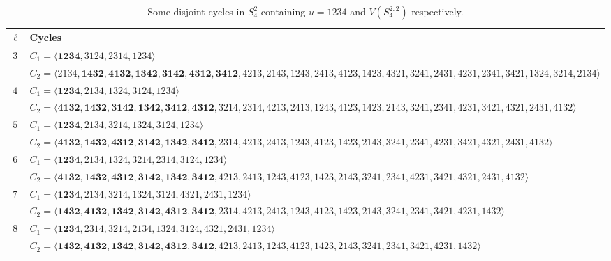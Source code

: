 \documentclass[12pt,a4paper]{amsart}
\newcounter{foo}[subsection]
\theoremstyle{definition}
\begin{document}
\begin{table}[htbp]
\centering
\begin{adjustbox}{angle=90,max height=\textheight} %
\begin{minipage}{\textheight} %
\centering
\caption{Some disjoint cycles in $S_4^2$ containing $u=1234$ and $V(S_4^{2:2})$ respectively.}
\label{3-13}

\footnotesize
\setlength{\tabcolsep}{2pt}
\renewcommand{\arraystretch}{0.9}

\begin{tabular}{@{}c l@{}}
\toprule
$\ell$ & Cycles \\
\midrule

$3$ &
$C_1=\langle\mathbf{1234},3124,2314,1234\rangle$\\
&
$C_2=\langle2134,\mathbf{1432,4132,1342,3142,4312,3412},4213,2143,1243,2413,4123,1423,4321,3241,2431,4231,2341,3421,1324,3214,2134\rangle$\\
\midrule

$4$ &
$C_1=\langle\mathbf{1234},2134,1324,3124,1234\rangle$\\
&
$C_2=\langle\mathbf{4132,1432,3142,1342,3412,4312},3214,2314,4213,2413,1243,4123,1423,2143,3241,2341,4231,3421,4321,2431,4132\rangle$\\

$5$ &
$C_1=\langle\mathbf{1234},2134,3214,1324,3124,1234\rangle$\\
&
$C_2=\langle\mathbf{4132,1432,4312,3142,1342,3412},2314,4213,2413,1243,4123,1423,2143,3241,2341,4231,3421,4321,2431,4132\rangle$
\\
\midrule

$6$ &
$C_1=\langle\mathbf{1234},2134,1324,3214,2314,3124,1234\rangle$\\
&
$C_2=\langle\mathbf{4132,1432,4312,3142,1342,3412},4213,2413,1243,4123,1423,2143,3241,2341,4231,3421,4321,2431,4132\rangle$
\\
\midrule

$7$ &
$C_1=\langle\mathbf{1234},2134,3214,1324,3124,4321,2431,1234\rangle$\\
&
$C_2=\langle\mathbf{1432,4132,1342,3142,4312,3412},2314,4213,2413,1243,4123,1423,2143,3241,2341,3421,4231,1432\rangle$
\\
\midrule

$8$ &
$C_1=\langle\mathbf{1234},2314,3214,2134,1324,3124,4321,2431,1234\rangle$\\
&
$C_2=\langle\mathbf{1432,4132,1342,3142,4312,3412},4213,2413,1243,4123,1423,2143,3241,2341,3421,4231,1432\rangle$
\\
\midrule


\end{tabular}
\end{minipage}
\end{adjustbox}
\end{table}
\end{document}
